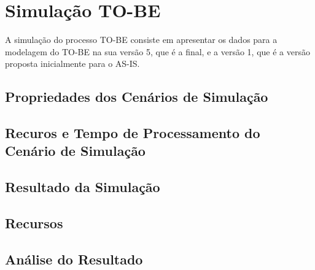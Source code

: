 \chapter[Simulação TO-BE]{Simulação TO-BE}
\label{chap:simulacao}
	A simulação do processo TO-BE consiste em apresentar os dados para a modelagem do TO-BE na sua versão 5, que é a final, e a versão 1, que é a versão proposta inicialmente para o AS-IS.

	\section[Propriedades dos Cenários de Simulação]{Propriedades dos Cenários de Simulação}
	\label{sec:simulacao_cenario}
		

	\section[Recuros e Tempo de Processamento do Cenário de Simulação]{Recuros e Tempo de Processamento do Cenário de Simulação}
	\label{sec:simulacao_tempo}
		

	\section[Resultado da Simulação]{Resultado da Simulação}
	\label{sec:simulacao_resultado}
		

	\section[Recursos]{Recursos}
	\label{sec:simulacao_recursos}
		

	\section[Análise do Resultado]{Análise do Resultado}
	\label{sec:simulacao_analise}
		